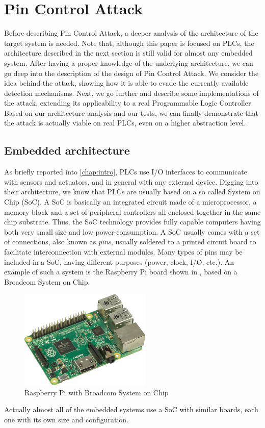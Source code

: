 \chapter{Pin Control Attack}
\label{chap:attack}

Before describing Pin Control Attack, a deeper analysis of the architecture of the target system is needed.
Note that, although this paper is focused on PLCs, the architecture described in the next section is still valid for almost any embedded system.
After having a proper knowledge of the underlying architecture, we can go deep into the description of the design of Pin Control Attack.
We consider the idea behind the attack, showing how it is able to evade the currently available detection mechanisms.
Next, we go further and describe some implementations of the attack, extending its applicability to a real Programmable Logic Controller.
Based on our architecture analysis and our tests, we can finally demonstrate that the attack is actually viable on real PLCs, even on a higher abstraction level.


\section{Embedded architecture}
\label{sec:embed_arch}

As briefly reported into \chap \ref{chap:intro}, PLCs use I/O interfaces to communicate with sensors and actuators, and in general with any external device.
Digging into their architecture, we know that PLCs are usually based on a so called System on Chip (SoC).
A SoC is basically an integrated circuit made of a microprocessor, a memory block and a set of peripheral controllers all enclosed together in the same chip substrate.
Thus, the SoC technology provides fully capable computers having both very small size and low power-consumption.
A SoC usually comes with a set of connections, also known as \emph{pins}, usually soldered to a printed circuit board to facilitate interconnection with external modules.
Many types of pins may be included in a SoC, having different purposes (power, clock, I/O, etc.).
An example of such a system is the Raspberry Pi board shown in \myfig{\ref{fig:raspberry}}, based on a Broadcom System on Chip.
\begin{figure}[h]
\centerline{\includegraphics[width=0.56\textwidth]{res/raspberry}}
\caption{Raspberry Pi \cite{raspberry} with Broadcom System on Chip \label{fig:raspberry}}
\end{figure}
Actually almost all of the embedded systems use a SoC with similar boards, each one with its own size and configuration.

